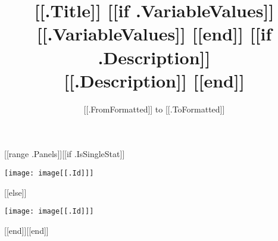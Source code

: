 \documentclass{article}
\begin{document}
\title{[[.Title]] [[if .VariableValues]] \\ \small [[.VariableValues]] [[end]] [[if .Description]] \\ \small [[.Description]] [[end]]}
\date{\small [[.FromFormatted]] to [[.ToFormatted]]}
\maketitle
\begin{center}
[[range .Panels]][[if .IsSingleStat]]\begin{minipage}{0.3\textwidth}
\texttt{[image: image[[.Id]]]}
\end{minipage}
[[else]]\par
\vspace{0.5cm}
\texttt{[image: image[[.Id]]]}
\par
\vspace{0.5cm}
[[end]][[end]]
\end{center}
\end{document}
